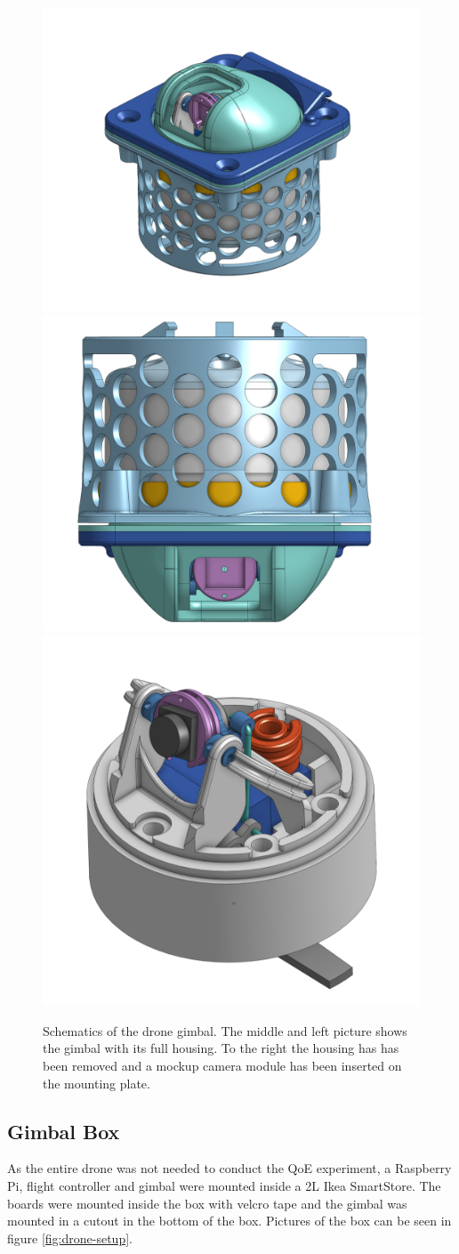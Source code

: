 \documentclass[nofilelist]{cslthse-msc}
\begin{document}
\begin{description}
   \begin{figure}[htp]
      \centering
      \includegraphics[width=.3\textwidth]{images/gimbal-1.png}\hfill
      \includegraphics[width=.3\textwidth]{images/gimbal-2.png}\hfill
      \includegraphics[width=.3\textwidth]{images/gimbal-3.png}
      \caption{Schematics of the drone gimbal. The middle and left picture shows the gimbal with its full housing. To the right the housing has has been removed and a mockup camera module has been inserted on the mounting plate.}
      \label{fig:gimbal-pics}
   \end{figure}
\end{description}
   
\subsection{Gimbal Box}
As the entire drone was not needed to conduct the QoE experiment, a Raspberry Pi, flight controller and gimbal were mounted inside a 2L Ikea SmartStore. The boards were mounted inside the box with velcro tape and the gimbal was mounted in a cutout in the bottom of the box. Pictures of the box can be seen in figure \ref{fig:drone-setup}.
\end{document}
